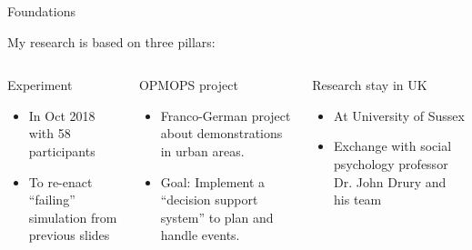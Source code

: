 \documentclass[compress,t,usenames,xcolor=dvipsnames]{beamer}
\begin{document}
\begin{frame}{Foundations}
    
    My research is based on three pillars:
    \vspace{-\baselineskip}
    \begin{columns}
        \begin{column}[t]{0.36\textwidth}
            \begin{block}{Experiment}
                \vspace{-0.5\baselineskip}
                \begin{itemize}
                    \item In Oct 2018 with 58 participants
                    \item To re-enact \enquote{failing} simulation from previous slides
                \end{itemize}
            \end{block}
        \end{column}
        \begin{column}[t]{0.40\textwidth}
            \begin{block}{OPMOPS project}
                \vspace{-0.5\baselineskip}
                \begin{itemize}
                    \item Franco-German project about demonstrations in urban areas.
                    \item Goal: Implement a \enquote{decision support system} to plan and handle events.
                \end{itemize}
            \end{block}
        \end{column}
        \begin{column}[t]{0.36\textwidth}
            \begin{block}{Research stay in UK}
                \vspace{-0.5\baselineskip}
                \begin{itemize}
                    \item At University of Sussex
                    \item Exchange with social psychology professor Dr. John Drury and his team
                \end{itemize}
            \end{block}
        \end{column}

\end{columns}
\end{frame}
\end{document}
